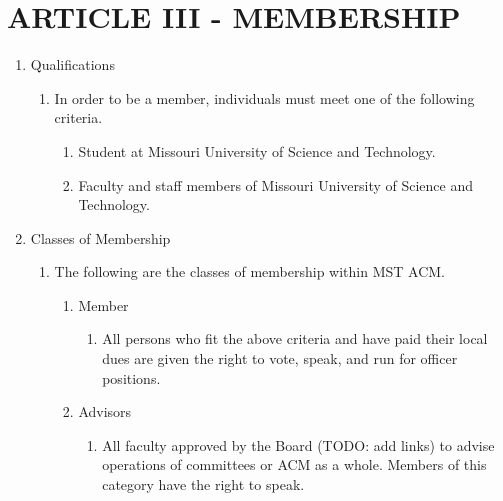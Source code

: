 \documentclass[11pt,a4paper,notitlepage]{article}
\begin{document}
\section*{ARTICLE III - MEMBERSHIP}
\begin{enumerate}[label=\arabic*.]
  \item Qualifications
    \begin{enumerate}[label=\alph*.]
      \item In order to be a member, individuals must meet one of the following
      criteria.
        \begin{enumerate}[label=\arabic*.]
          \item Student at Missouri University of Science and Technology.
          \item Faculty and staff members of Missouri University of Science and
          Technology.
        \end{enumerate}
    \end{enumerate}
  \item Classes of Membership
    \begin{enumerate}[label=\arabic*.]
      \item The following are the classes of membership within MST ACM.
        \begin{enumerate}[label=\alph*.]
          \item Member
            \begin{enumerate}[label=\arabic*.]
              \item All persons who fit the above criteria and have paid their
              local dues are given the right to vote, speak, and run for officer
              positions.
            \end{enumerate}
          \item Advisors
            \begin{enumerate}[label=\alph*.]
              \item All faculty approved by the Board (TODO: add links) to
              advise operations of committees or ACM as a whole. Members of this
              category have the right to speak.
            \end{enumerate}
        \end{enumerate}
    \end{enumerate}
\end{enumerate}



\end{document}
